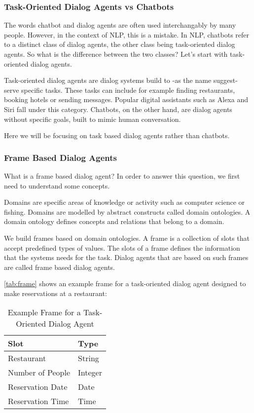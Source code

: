 \subsubsection{Task-Oriented Dialog Agents vs Chatbots}
The words chatbot and dialog agents are often used interchangably by many people.
However, in the context of NLP, this is a mistake.
In NLP, chatbots refer to a distinct class of dialog agents, the other class being task-oriented dialog agents.
So what is the difference between the two classes? 
Let's start with task-oriented dialog agents.

Task-oriented dialog agents are dialog systems build to -as the name suggest- serve specific tasks.
These tasks can include for example finding restaurants, booking hotels or sending messages.
Popular digital assistants such as Alexa and Siri fall under this category.
Chatbots, on the other hand, are dialog agents without specific goals, built to mimic human conversation.

Here we will be focusing on task based dialog agents rather than chatbots.

\subsubsection{Frame Based Dialog Agents}
What is a frame based dialog agent?
In order to answer this question, we first need to understand some concepts.

Domains are specific areas of knowledge or activity such as computer science or fishing.
Domains are modelled by abstract constructs called domain ontologies.
A domain ontology defines concepts and relations that belong to a domain.

We build frames based on domain ontologies.
A frame is a collection of slots that accept predefined types of values.
The slots of a frame defines the information that the systems needs for the task.
Dialog agents that are based on such frames are called frame based dialog agents.

\autoref{tab:frame} shows an example frame for a task-oriented dialog agent designed to make reservations at a restaurant:

\begin{table}[htbp]
  \caption[Example Frame for a Task-Oriented Dialog Agent]{Example Frame for a Task-Oriented Dialog Agent}\label{tab:frame}
  \centering
  \begin{tabular}{l|l}
    Slot&Type\\ \toprule
    Restaurant&String\\ \hline
    Number of People&Integer\\ \hline
    Reservation Date&Date\\ \hline
    Reservation Time&Time\\ \hline
  \end{tabular}
\end{table}


